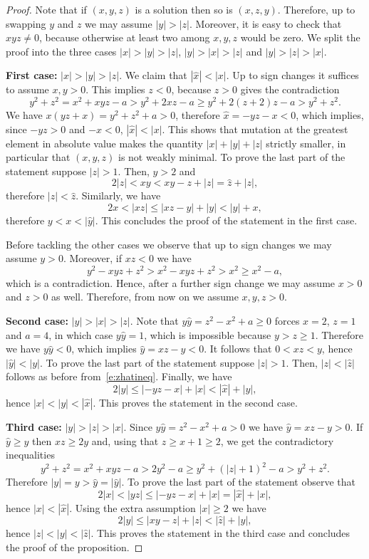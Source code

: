 \documentclass[11pt,a4paper]{amsart}
\theoremstyle{definition}
\numberwithin{equation}{section}
\begin{document}
\begin{proof} 
Note that if $(x,y,z)$ is a solution then so is $(x,z,y)$. Therefore, 
up to swapping $y$ and $z$ we may assume $|y|>|z|$. Moreover, it is easy to check that $xyz\neq 0$, 
because otherwise at least two among $x,y,z$ would be zero. We split the proof into the three cases
$|x| > |y| > |z|$, $|y| > |x| > |z|$ and $|y| > |z| > |x|$.

\smallskip\noindent
{\bf First case:} $|x| > |y| > |z|$. We claim that $|\hat x|<|x|$. Up to sign changes it suffices to assume $x,y>0$. This implies $z<0$, because $z>0$ gives the contradiction
\[
y^2+z^2 = x^2+xyz-a > y^2 + 2xz-a \ge y^2+2(z+2)z-a> y^2+z^2.
\]
We have $x(yz+x)=y^2+z^2+a>0$, therefore $\hat x = -yz - x < 0$, which implies, since $-yz>0$ and $-x<0$, $|\hat x|<|x|$. 
This shows that mutation at the greatest element in absolute value makes the quantity $|x|+|y|+|z|$ strictly smaller, in particular that $(x,y,z)$ is not weakly minimal. 
To prove the last part of the statement suppose $|z|>1$. 
Then, $y>2$ and  
\begin{equation}\label{e:zhatineq}
2|z| < xy < xy-z + |z| = \hat z + |z|,
\end{equation}
therefore $|z| < \hat z$.
\color{black}
Similarly, we have 
\[
2 x < |xz| \leq |xz - y| + |y| < |\hat y| + x,
\]
therefore $y < x < |\hat y|$. This concludes the proof of the statement in the first case. 

Before tackling the other cases we observe that up to sign changes we may 
assume $y>0$. Moreover, if $xz<0$ we have  
\[
y^2 -xyz + z^2 > x^2 -xyz + z^2 > x^2 \ge x^2-a,
\]
which is a contradiction. Hence, after a further sign change we may assume 
$x>0$ and $z>0$ as well. Therefore, from now on we assume $x,y,z>0$. 

\smallskip\noindent
{\bf Second case:} $|y|>|x|>|z|$. 
Note that $y\hat y = z^2-x^2+a \geq 0$ forces $x=2$, $z=1$ and $a=4$, in which case   
$y\hat y = 1$, which is impossible because $y>z\geq 1$. Therefore we have 
$y\hat y<0$, which implies $\hat y = xz-y<0$. 
It follows that $0 < xz < y$, hence $|\hat y| < |y|$. 
To prove the last part of the statement suppose $|z|>1$. Then, 
$|z|<|\hat z|$ follows as before from~\eqref{e:zhatineq}. 
Finally, we have 
$$
2|y| \leq |-yz - x| + |x| < |\hat x| + |y|,
$$	
hence $|x|<|y|<|\hat x|$. This proves the statement in the second case. 

	\smallskip\noindent
	{\bf Third case:} $|y|>|z|>|x|$.
Since $y\hat y = z^2-x^2+a>0$ we have $\hat y = xz-y>0$. If $\hat y \ge y$ then $xz \ge 2y$ 
and, using that $z\geq x+1\geq 2$, we get the contradictory inequalities
\[
y^2 + z^2 = x^2 + xyz-a > 2y^2-a \geq y^2 + (|z|+1)^2 - a > y^2 + z^2.
\]
Therefore $|y|=y > \hat y = |\hat y|$. 
To prove the last part of the statement observe that 
\[
2|x| < |yz| \leq |-yz-x|+|x| = |\hat x| + |x|, 
\]
hence $|x|<|\hat x|$. Using the extra assumption $|x|\geq 2$ we have  
$$
2|y| \leq |xy - z| + |z| < |\hat z| + |y|,
$$
hence $|z|<|y|<|\hat z|$. This proves the statement in the third case and concludes the proof of the proposition. 
\end{proof}
\color{black}
\end{document}
